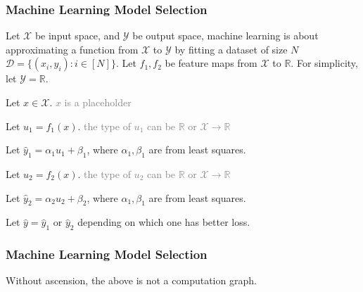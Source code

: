 \documentclass{beamer}   	%
\theoremstyle{definition}
\begin{document}
\begin{frame}
\frametitle{Machine Learning Model Selection}

Let $\mathcal{X}$ be input space, and $\mathcal{Y}$ be output space, machine learning is about approximating a function from $\mathcal{X}$ to $\mathcal{Y}$ by fitting a dataset of size $N$ $\mathcal{D}=\{(x_i,y_i):i\in [N]\}$. Let $f_1,f_2$ be feature maps from $\mathcal{X}$ to $\mathbb{R}$.
For simplicity, let $\mathcal{Y}=\mathbb{R}$.

\begin{tcolorbox}
Let $x \in \mathcal{X}$. \textcolor{gray}{$x$ is a placeholder}

Let $u_1 = f_1(x)$. \textcolor{gray}{the type of $u_1$ can be $\mathbb{R}$ or $\mathcal{X}\to \mathbb{R}$}

Let $\hat{y}_1 = \alpha_1 u_1 + \beta_1$, where $\alpha_1, \beta_1$ are from least squares.

Let $u_2 = f_2(x)$. \textcolor{gray}{the type of $u_2$ can be $\mathbb{R}$ or $\mathcal{X}\to \mathbb{R}$}

Let $\hat{y}_2 = \alpha_2 u_2 + \beta_2$, where $\alpha_1, \beta_1$ are from least squares.

Let $\hat{y} = \hat{y}_1\text{ or }\hat{y}_2$ depending on which one has better loss.
\end{tcolorbox}
\end{frame}

\begin{frame}
\frametitle{Machine Learning Model Selection}
\begin{center}
\end{center}

Without ascension, the above is not a computation graph.

\end{frame}
\end{document}
